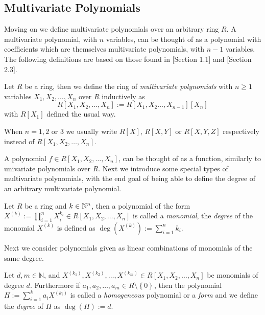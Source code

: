 \subsection{Multivariate Polynomials}
Moving on we define multivariate polynomials over an arbitrary ring $R$. A multivariate polynomial, with $n$ variables, can be thought of as a polynomial with coefficients which are themselves multivariate polynomials, with $n - 1$ variables. The following definitions are based on those found in \cite{Fulton}[Section 1.1] and \cite{lang}[Section 2.3].
\begin{definition} \label{def:multivariate_polynomials}
  Let $R$ be a ring, then we define the ring of \textit{multivariate polynomials} with $n \geq 1$ variables $X_1, X_2, \ldots, X_{n}$ over $R$ inductively as
  \begin{equation*}
    R[X_{1}, X_{2}, \ldots, X_{n}] := R[X_{1}, X_{2} \ldots, X_{n - 1}][X_{n}]
  \end{equation*}
  with $R[X_{1}]$ defined the usual way.
\end{definition}
\begin{remark}
When $n = 1, 2$ or $3$ we usually write $R[X]$, $R[X, Y]$ or $R[X, Y, Z]$ respectively instead of $R[X_1, X_2, \ldots, X_{n}]$.
\end{remark}
A polynomial $f \in R[X_1, X_2, \ldots, X_{n}]$, can be thought of as a function, similarly to univariate polynomials over $R$. Next we introduce some special types of multivariate polynomials, with the end goal of being able to define the degree of an arbitrary multivariate polynomial.
\begin{definition}\label{def:monomial}
  Let $R$ be a ring and $k \in \mathbb{N}^{n}$, then a polynomial of the form $X^{(k)} := \prod_{i = 1}^{n}X_{i}^{k_{i}} \in R[X_1, X_2, \ldots, X_{n}]$ is called a \textit{monomial}, the \textit{degree} of the monomial $X^{(k)}$ is defined as $\deg\left(X^{(k)}\right) := \sum^{n}_{i = 1} k_{i}$.
\end{definition}
Next we consider polynomials given as linear combinations of monomials of the same degree.
\begin{definition}\label{def:homogeneous_poly}
  Let $d, m \in \mathbb{N}$, and $X^{(k_{1})}, X^{(k_{2})}, \ldots, X^{(k_{m})} \in R[X_1, X_2, \ldots, X_{n}]$ be monomials of degree $d$. Furthermore if $a_1, a_2, \ldots, a_{m} \in R \setminus \left\{0\right\}$, then the polynomial $H := \sum^{k}_{i = 1} a_{i} X^{(k_{i})}$ is called a \textit{homogeneous} polynomial or a \textit{form}
  and we define the \textit{degree} of $H$ as $\deg(H) := d$.
\end{definition}

